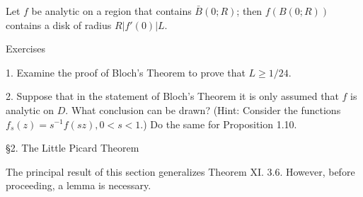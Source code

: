 Let $f$ be analytic on a region that contains $\bar{B}(0; R)$; then $f(B(0; R))$ contains a disk of radius $R | f'(0)| L$.

Exercises

1. Examine the proof of Bloch's Theorem to prove that $L \geq 1/24$.

2. Suppose that in the statement of Bloch's Theorem it is only assumed that $f$ is analytic on $D$. What conclusion can be drawn? (Hint: Consider the functions $f_s(z) = s^{-1} f(sz), 0 < s < 1$.) Do the same for Proposition 1.10.

§2. The Little Picard Theorem

The principal result of this section generalizes Theorem XI. 3.6. However, before proceeding, a lemma is necessary.